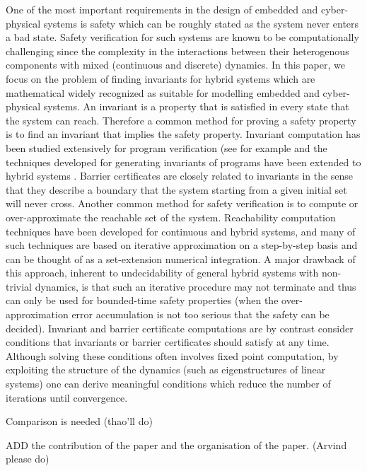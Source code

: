 One of the most important requirements in the design of embedded and cyber-physical systems is safety which can be roughly stated as the system never enters a bad state. Safety verification for such systems are known to be computationally challenging since the complexity in the interactions between their heterogenous components with mixed (continuous and discrete) dynamics. In this paper, we focus on the problem of finding invariants for hybrid systems which are mathematical widely recognized as suitable for modelling embedded and cyber-physical systems. An invariant is a property that is satisfied in every state that the system can reach. 
Therefore a common method for proving a safety property is to find an invariant that implies the safety property. Invariant computation has been studied extensively for program verification (see for example \cite{CousotHalbwachs1978,Bensalem2000,Tiwari2001,SriramSipma2004,colonSriramSipma2003,Fluctuate} and the techniques developed for generating invariants of programs have been extended to hybrid systems \cite{Sriram,Jeannet,tiwariRodriguezCarbonellPolynomialInvariants,Goubault,HybridFluctuate,differentialInvariantPlatzer,Gawlitza}. Barrier certificates \cite{Parillo...} are closely related to invariants in the sense that they describe a boundary that the system starting from a given initial set will never cross. Another common method for safety verification is to compute or over-approximate the reachable set of the system. Reachability computation techniques have been developed for continuous and hybrid systems, and many of such techniques are based on iterative approximation on a step-by-step basis and can be thought of as a set-extension numerical integration. A major drawback of this approach, inherent to undecidability of general hybrid systems with non-trivial dynamics, is that such an iterative procedure may not terminate and thus can only be used for bounded-time safety properties (when the over-approximation error accumulation is not too serious that the safety can be decided). Invariant and barrier certificate computations are by contrast consider conditions that invariants or barrier certificates should satisfy at any time. Although solving these conditions often involves fixed point computation, by exploiting the structure of the dynamics (such as eigenstructures of linear systems) one can derive meaningful conditions which reduce the number of iterations until convergence.

Comparison is needed (thao'll do)

ADD the contribution of the paper and the organisation of the paper. (Arvind please do)
